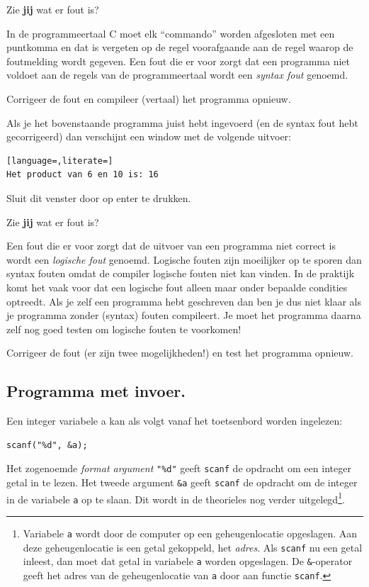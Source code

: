 \documentclass[a4paper,10pt,fleqn,twoside]{article}
\begin{document}
Zie \textbf{jij} wat er fout is?

In de programmeertaal C moet elk ``commando'' worden afgesloten met een puntkomma en dat is vergeten op de regel voorafgaande aan de regel waarop de foutmelding wordt gegeven. Een fout die er voor zorgt dat een programma niet voldoet aan de regels van de programmeertaal wordt een \textsl{syntax fout} genoemd.

Corrigeer de fout en compileer (vertaal) het programma opnieuw.

Als je het bovenstaande programma juist hebt ingevoerd (en de syntax fout hebt gecorrigeerd) dan verschijnt een window met de volgende uitvoer:

\begin{lstlisting}[language=,literate=]
Het product van 6 en 10 is: 16
\end{lstlisting}

Sluit dit venster door op enter te drukken.

Zie \textbf{jij} wat er fout is?

Een fout die er voor zorgt dat de uitvoer van een programma niet correct is wordt een \textsl{logische fout} genoemd. Logische fouten zijn moeilijker op te sporen dan syntax fouten omdat de compiler logische fouten niet kan vinden. In de praktijk komt het vaak voor dat een logische fout alleen maar onder bepaalde condities optreedt. Als je zelf een programma hebt geschreven dan ben je dus niet klaar als je programma zonder (syntax) fouten compileert. Je moet het programma daarna zelf nog goed testen om logische fouten te voorkomen! 

Corrigeer de fout (er zijn twee mogelijkheden!) en test het programma opnieuw.

\subsection{Programma met invoer.}
Een integer variabele a kan als volgt vanaf het toetsenbord worden ingelezen:

\begin{lstlisting}
scanf("%d", &a);
\end{lstlisting}

Het  zogenoemde \textsl{format argument} \lstinline|"%d"| geeft \lstinline|scanf| de opdracht om een integer getal in te lezen. Het tweede argument \lstinline|&a| geeft \lstinline|scanf| de opdracht om de integer in de variabele \lstinline|a| op te slaan. Dit wordt in de theorieles nog verder uitgelegd\footnote{Variabele \lstinline|a| wordt door de computer op een geheugenlocatie opgeslagen. Aan deze geheugenlocatie is een getal gekoppeld, het \textsl{adres}. Als \lstinline|scanf| nu een getal inleest, dan moet dat getal in variabele \lstinline|a| worden opgeslagen. De \lstinline|&|-operator geeft het adres van de geheugenlocatie van \lstinline|a| door aan functie \lstinline|scanf|.}.
\end{document}
